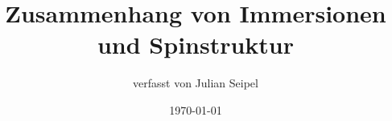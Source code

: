 \subject{Universität Regensburg\\Bachelorarbeit}
\title{Zusammenhang von Immersionen und Spinstruktur}
\author{verfasst von Julian Seipel}
\date{\today}

\maketitle
\thispagestyle{empty}

\newpage
